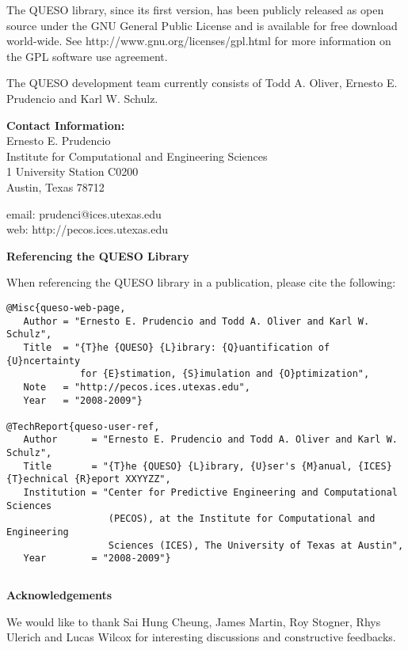 The QUESO library, since its first version, has been publicly released as open source
under the GNU General Public License and is available for free download world-wide.
See http://www.gnu.org/licenses/gpl.html for more information on the GPL software use agreement.

The QUESO development team currently consists of
Todd A. Oliver,
Ernesto E. Prudencio and
Karl W. Schulz.

{\bf Contact Information:}\\
Ernesto E. Prudencio\\
Institute for Computational and Engineering Sciences\\
1 University Station C0200\\
Austin, Texas 78712

email: prudenci@ices.utexas.edu\\
web: http://pecos.ices.utexas.edu\\
$~$\\

\centerline{\bf Referencing the QUESO Library}

When referencing the QUESO library in a publication, please cite the following:
\begin{verbatim}
@Misc{queso-web-page,
   Author = "Ernesto E. Prudencio and Todd A. Oliver and Karl W. Schulz",
   Title  = "{T}he {QUESO} {L}ibrary: {Q}uantification of {U}ncertainty
             for {E}stimation, {S}imulation and {O}ptimization",
   Note   = "http://pecos.ices.utexas.edu",
   Year   = "2008-2009"}

@TechReport{queso-user-ref,
   Author      = "Ernesto E. Prudencio and Todd A. Oliver and Karl W. Schulz",
   Title       = "{T}he {QUESO} {L}ibrary, {U}ser's {M}anual, {ICES} {T}echnical {R}eport XXYYZZ",
   Institution = "Center for Predictive Engineering and Computational Sciences
                  (PECOS), at the Institute for Computational and Engineering
                  Sciences (ICES), The University of Texas at Austin",
   Year        = "2008-2009"}
\end{verbatim}
$~$\\
$~$\\

\centerline{\bf Acknowledgements}

We would like to thank Sai Hung Cheung, James Martin, Roy Stogner, Rhys Ulerich and
Lucas Wilcox for interesting discussions and constructive feedbacks.

